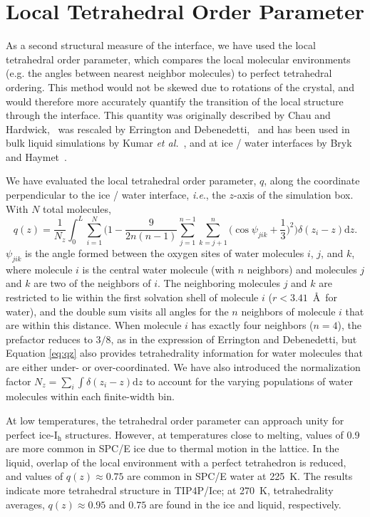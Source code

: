 \section{Local Tetrahedral Order Parameter}\label{sec:tetra}
As a second structural measure of the interface, we have used the
local tetrahedral order parameter, which compares the local molecular
environments (e.g. the angles between nearest neighbor molecules) to
perfect tetrahedral ordering. This method would not be skewed due to
rotations of the crystal, and would therefore more accurately quantify
the transition of the local structure through the interface. This
quantity was originally described by Chau and
Hardwick,~\cite{Chau1998} was rescaled by Errington and
Debenedetti,~\cite{Errington2001} and has been used in bulk liquid
simulations by Kumar \textit{et al.}~\cite{Kumar2009}, and at ice /
water interfaces by Bryk and Haymet~\cite{Bryk2004}.

We have evaluated the local tetrahedral order parameter, $q$, along
the coordinate perpendicular to the ice / water interface,
\textit{i.e}., the $z$-axis of the simulation box. With $N$ total molecules,
\begin{equation}
q(z) = \frac{1}{N_z} \int_0^L \sum_{i=1}^{N} \Bigg(1 -\frac{9}{2n(n-1)}\sum_{j=1}^{n-1}
\sum_{k=j+1}^{n} \bigg(\cos\psi_{jik}+\frac{1}{3}\bigg)^2\Bigg)
\delta(z_{i}-z)\mathrm{d}z .
\label{eq:qz}
\end{equation}
$\psi_{jik}$ is the angle formed between the oxygen sites of water
molecules $i$, $j$, and $k$, where molecule $i$ is the central water
molecule (with $n$ neighbors) and molecules $j$ and $k$ are two of the
neighbors of $i$.  The neighboring molecules $j$ and $k$ are
restricted to lie within the first solvation shell of molecule $i$
($r < 3.41$~\AA\ for water), and the double sum visits all angles for
the $n$ neighbors of molecule $i$ that are within this distance.  When
molecule $i$ has exactly four neighbors ($n=4$), the prefactor reduces
to $3/8$, as in the expression of Errington and Debenedetti, but
Equation \eqref{eq:qz} also provides tetrahedrality information for water
molecules that are either under- or over-coordinated. We have also
introduced the normalization factor
$N_z = \sum_i \int \delta(z_i - z) \mathrm{d}z$ to account for the
varying populations of water molecules within each finite-width bin.

At low temperatures, the tetrahedral order parameter can approach
unity for perfect ice-I$_\mathrm{h}$ structures. However, at
temperatures close to melting, values of 0.9 are more common in SPC/E
ice due to thermal motion in the lattice. In the liquid, overlap of
the local environment with a perfect tetrahedron is reduced, and
values of $q(z) \approx 0.75$ are common in SPC/E water at 225~K. The
results indicate more tetrahedral structure in TIP4P/Ice; at
270~K, tetrahedrality averages, $q(z) \approx 0.95$ and $0.75$ are
found in the ice and liquid, respectively.

